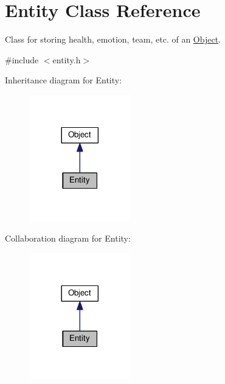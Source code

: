 \hypertarget{classEntity}{}\section{Entity Class Reference}
\label{classEntity}


Class for storing health, emotion, team, etc. of an \hyperlink{classObject}{Object}.  




{\ttfamily \#include $<$entity.\+h$>$}



Inheritance diagram for Entity\+:\nopagebreak
\begin{figure}[H]
\begin{center}
\leavevmode
\includegraphics[width=125pt]{classEntity__inherit__graph}
\end{center}
\end{figure}


Collaboration diagram for Entity\+:\nopagebreak
\begin{figure}[H]
\begin{center}
\leavevmode
\includegraphics[width=125pt]{classEntity__coll__graph}
\end{center}
\end{figure}
